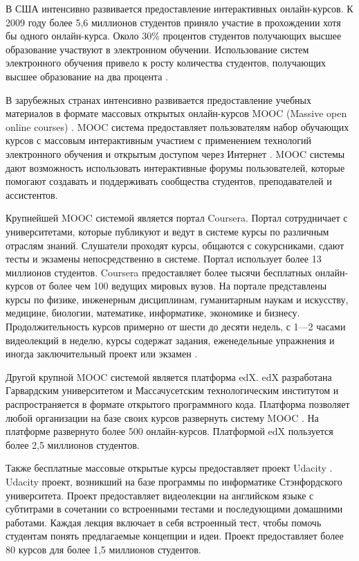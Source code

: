 В США интенсивно развивается предоставление интерактивных онлайн-курсов. К 2009 году более 5,6 миллионов студентов приняло участие в прохождении хотя бы одного онлайн-курса. Около 30\% процентов студентов получающих высшее образование участвуют в электронном обучении. Использование систем электронного обучения привело к росту количества студентов, получающих высшее образование на два процента \cite{allen2010class}.

В зарубежных странах интенсивно развивается предоставление учебных материалов в формате массовых открытых онлайн-курсов MOOC (Massive open online courses) \cite{pappano2012year}. MOOC система предоставляет пользователям набор обучающих курсов с массовым интерактивным участием с применением технологий электронного обучения и открытым доступом через Интернет \cite{mcauley2010mooc}. MOOC системы дают возможность использовать интерактивные форумы пользователей, которые помогают создавать и поддерживать сообщества студентов, преподавателей и ассистентов.

Крупнейшей MOOC системой является портал Coursera. Портал сотрудничает с университетами, которые публикуют и ведут в системе курсы по различным отраслям знаний. Слушатели проходят курсы, общаются с сокурсниками, сдают тесты и экзамены непосредственно в системе. Портал использует более 13 миллионов студентов. Coursera предоставляет более тысячи бесплатных онлайн-курсов от более чем 100 ведущих мировых вузов. На портале представлены курсы по физике, инженерным дисциплинам, гуманитарным наукам и искусству, медицине, биологии, математике, информатике, экономике и бизнесу. Продолжительность курсов примерно от шести до десяти недель, с 1—2 часами видеолекций в неделю, курсы содержат задания, еженедельные упражнения и иногда заключительный проект или экзамен \cite{knox2012mooc}.

Другой крупной MOOC системой является платформа edX. edX разработана Гарвардским университетом и Массачусетским технологическим институтом и распространяется в формате открытого программного кода. Платформа позволяет любой организации на базе своих курсов развернуть систему MOOC \cite{breslow2013studying}. На платформе развернуто более 500 онлайн-курсов. Платформой edX пользуется более 2,5 миллионов студентов. 

Также бесплатные массовые открытые курсы предоставляет проект Udacity \cite{salmon2012udacity}. Udacity проект, возникший на базе программы по информатике Стэнфордского университета. Проект предоставляет видеолекции на английском языке с субтитрами в сочетании со встроенными тестами и последующими домашними работами. Каждая лекция включает в себя встроенный тест, чтобы помочь студентам понять предлагаемые концепции и идеи. Проект предоставляет более 80 курсов для более 1,5 миллионов студентов.

